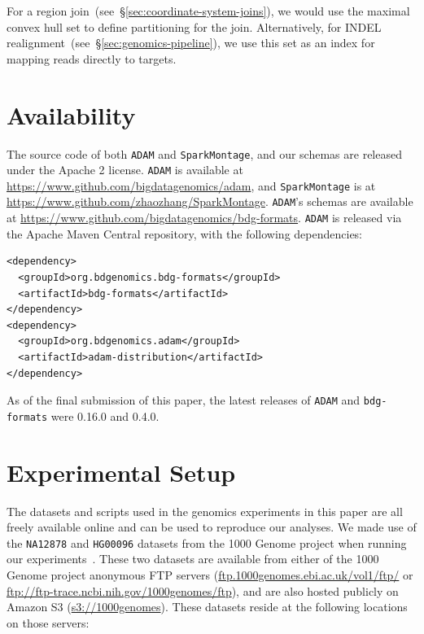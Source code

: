 \documentclass{acm_proc_article-sp}
\begin{document}
For a region join~(see~\S\ref{sec:coordinate-system-joins}), we would use the maximal convex hull
set to define partitioning for the join. Alternatively, for INDEL realignment~(see~\S\ref{sec:genomics-pipeline}),
we use this set as an index for mapping reads directly to targets.

\section{Availability}
\label{sec:availability}

The source code of both \texttt{ADAM} and \texttt{SparkMontage}, and our schemas are released under the Apache 2
license. \texttt{ADAM} is available at \url{https://www.github.com/bigdatagenomics/adam}, and \texttt{SparkMontage}
is at \url{https://www.github.com/zhaozhang/SparkMontage}. \texttt{ADAM}'s schemas are available at
\url{https://www.github.com/bigdatagenomics/bdg-formats}. \linebreak \texttt{ADAM} is released via the Apache Maven
Central repository, with the following dependencies:

\begin{verbatim}
<dependency>
  <groupId>org.bdgenomics.bdg-formats</groupId>
  <artifactId>bdg-formats</artifactId>
</dependency>
<dependency>
  <groupId>org.bdgenomics.adam</groupId>
  <artifactId>adam-distribution</artifactId>
</dependency>
\end{verbatim}

As of the final submission of this paper, the latest releases of \texttt{ADAM} and \texttt{bdg-formats} were 0.16.0 and 0.4.0.

\section{Experimental Setup}
\label{sec:experimental-setup}

The datasets and scripts used in the genomics experiments in this paper are all freely available online
and can be used to reproduce our analyses. We made use of the \texttt{NA12878} and \texttt{HG00096}
datasets from the 1000 Genome project when running our experiments~\cite{siva08}. These two datasets
are available from either of the 1000 Genome project anonymous FTP servers
(\url{ftp.1000genomes.ebi.ac.uk/vol1/ftp/} or \url{ftp://ftp-trace.ncbi.nih.gov/1000genomes/ftp}), and are
also hosted publicly on Amazon S3 (\url{s3://1000genomes}). These datasets reside at the following
locations on those servers:
\end{document}
